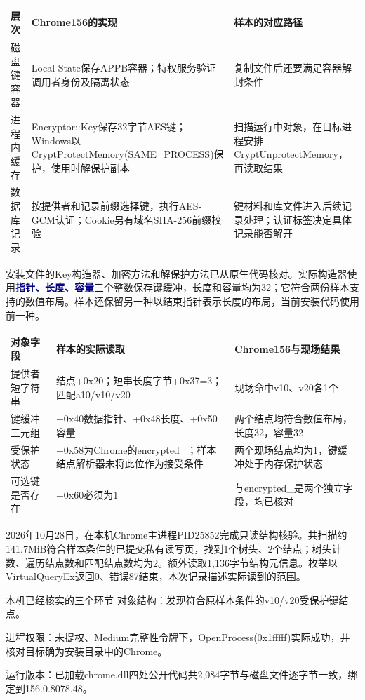 \documentclass[UTF8,a4paper,zihao=5,fontset=windows]{ctexart}
\newcommand{\code}[1]{{\ttfamily\small #1}}
\newcommand{\term}[1]{\textbf{\textcolor{Navy}{#1}}}
\begin{document}
\begin{longtable}{@{}L{27mm}L{66mm}L{57mm}@{}}\toprule 层次 & Chrome156的实现 & 样本的对应路径\\\midrule\endhead
磁盘键容器 & \code{Local State}保存APPB容器；特权服务验证调用者身份及隔离状态 & 复制文件后还要满足容器解封条件\\
进程内缓存 & \code{Encryptor::Key}保存32字节AES键；Windows以\code{CryptProtectMemory(SAME\_PROCESS)}保护，使用时解保护副本 & 扫描运行中对象，在目标进程安排\code{CryptUnprotectMemory}，再读取结果\\
数据库记录 & 按提供者和记录前缀选择键，执行AES-GCM认证；Cookie另有域名SHA-256前缀校验 & 键材料和库文件进入后续记录处理；认证标签决定具体记录能否解开\\\bottomrule\end{longtable}

安装文件的Key构造器、加密方法和解保护方法已从原生代码核对。实际构造器使用\term{指针、长度、容量}三个整数保存键缓冲，长度和容量均为32；它符合两份样本支持的数值布局。样本还保留另一种以结束指针表示长度的布局，当前安装代码使用前一种。

\begin{longtable}{@{}L{37mm}L{54mm}L{59mm}@{}}\toprule 对象字段 & 样本的实际读取 & Chrome156与现场结果\\\midrule\endhead
提供者短字符串 & 结点\code{+0x20}；短串长度字节\code{+0x37=3}；匹配\code{a10/v10/v20} & 现场命中\code{v10}、\code{v20}各1个\\
键缓冲三元组 & \code{+0x40}数据指针、\code{+0x48}长度、\code{+0x50}容量 & 两个结点均符合数值布局，长度32，容量32\\
受保护状态 & \code{+0x58}为Chrome的\code{encrypted\_}；样本结点解析器未将此位作为接受条件 & 两个现场结点均为1，键缓冲处于内存保护状态\\
可选键是否存在 & \code{+0x60}必须为1 & 与\code{encrypted\_}是两个独立字段，均已核对\\\bottomrule\end{longtable}

2026年10月28日，在本机Chrome主进程PID\code{25852}完成只读结构核验。共扫描约141.7MiB符合样本条件的已提交私有读写页，找到1个树头、2个结点；树头计数、遍历结点数和匹配结点数均为2。额外读取1,136字节结构元信息。枚举以\code{VirtualQueryEx}返回0、错误87结束，本次记录描述实际读到的范围。

\begin{finding}{本机已经核实的三个环节}
对象结构：发现符合原样本条件的\code{v10/v20}受保护键结点。\par
进程权限：未提权、Medium完整性令牌下，\code{OpenProcess(0x1fffff)}实际成功，并核对目标确为安装目录中的Chrome。\par
运行版本：已加载\code{chrome.dll}四处公开代码共2,084字节与磁盘文件逐字节一致，绑定到\code{156.0.8078.48}。
\end{finding}
\end{document}
